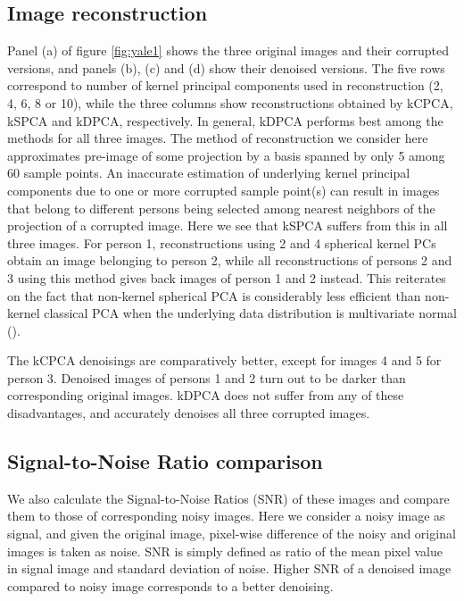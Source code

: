 \documentclass[10pt, conference, compsocconf]{IEEEtran}
\begin{document}
\subsection{Image reconstruction}

Panel (a) of figure \ref{fig:yale1} shows the three original images and their corrupted versions, and panels (b), (c) and (d) show their denoised versions. The five rows correspond to number of kernel principal components used in reconstruction (2, 4, 6, 8 or 10), while the three columns show reconstructions obtained by  kCPCA, kSPCA and kDPCA, respectively. In general, kDPCA performs best among the methods for all three images. The method of reconstruction we consider here approximates pre-image of some projection by a basis spanned by only 5 among 60 sample points. An inaccurate estimation of underlying kernel principal components due to one or more corrupted sample point(s) can result in images that belong to different persons being selected among nearest neighbors of the projection of a corrupted image. Here we see that kSPCA suffers from this in all three images. For person 1, reconstructions using 2 and 4 spherical kernel PCs obtain an image belonging to person 2, while all reconstructions of persons 2 and 3 using this method gives back images of person 1 and 2 instead. This reiterates on the fact that non-kernel spherical PCA is considerably less efficient than non-kernel classical PCA when the underlying data distribution is multivariate normal (\cite{magyar14, Majumdar15}).

The kCPCA denoisings are comparatively better, except for images 4 and 5 for person 3. Denoised images of persons 1 and 2 turn out to be darker than corresponding original images. kDPCA does not suffer from any of these disadvantages, and accurately denoises all three corrupted images.

\subsection{Signal-to-Noise Ratio comparison}

We also calculate the Signal-to-Noise Ratios (SNR) of these images and compare them to those of corresponding noisy images. Here we consider a noisy image as signal, and given the original image, pixel-wise difference of the noisy and original images is taken as noise. SNR is simply defined as ratio of the mean pixel value in signal image and standard deviation of noise. Higher SNR of a denoised image compared to noisy image corresponds to a better denoising.
\end{document}
